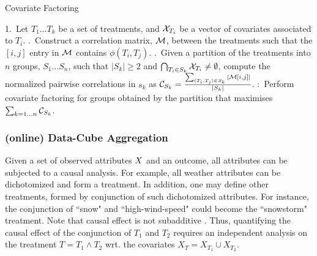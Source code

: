 \vspace{-0.2cm}\begin{algorithm}

\caption{Covariate Factoring}
\label{al:cf1} \small

1.\  Let $T_1 \ldots T_k$ be a set of treatments, and  ${{\mathcal{X}}}_{T_i}$ be a vector of covariates associated to $T_i$.   .\ Construct a correlation matrix, $\mathcal{M}$, between the treatments such that
the $[i,j]$ entry in $\mathcal{M}$ contains $\phi(T_i,T_j)$.   .\ Given a partition of the treatments into $n$ groups, $S_1 \ldots S_n$, such that $|S_k|\geq 2$ and
  $\bigcap_{T_i \in S_k} {{\mathcal{X}}}_{T_i} \not = \emptyset$, compute the normalized pairwise correlations in $s_k$
  as $\mathcal{C}_{S_k}= \frac{\sum_{(T_i,T_j) \in S_k} |\mathcal{M}[i,j]|}{|S_k|}$. :\ Perform covariate factoring for groups obtained by the partition that maximises $\sum_{k=1\dots n} \mathcal{C}_{S_k}$.

\end{algorithm}

\vspace{-0.5cm}


\subsubsection{(online)  Data-Cube Aggregation}
\label{sec:cube}

Given a set of observed attributes ${{X}}$ and an outcome, all attributes can be subjected to a causal
analysis. For example, all weather attributes can be dichotomized and form
a treatment. In addition, one may define other treatments, formed by conjunction of such dichotomized attributes. For instance, the conjunction of ``snow" and ``high-wind-speed" could become the ``snowstorm" treatment. Note that
causal effect is not subadditive \cite{janzing2013quantifying}. Thus, quantifying the causal effect of the conjunction of $T_1$ and $T_2$
requires an independent analysis on the treatment $T=T_1 \land T_2$ wrt. the covariates  $X_{T}= X_{T_1} \cup X_{T_2}$.

